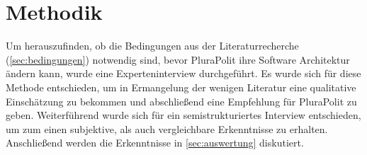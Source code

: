 \section{Methodik}
\label{sec:methodik}

Um herauszufinden, ob die Bedingungen aus der Literaturrecherche (\cref{sec:bedingungen}) notwendig sind, bevor PluraPolit ihre Software Architektur ändern kann, wurde eine Experteninterview durchgeführt. Es wurde sich für diese Methode entschieden, um in Ermangelung der wenigen Literatur eine qualitative Einschätzung zu bekommen und abschließend eine Empfehlung für PluraPolit zu geben. Weiterführend wurde sich für ein semistrukturiertes Interview entschieden, um zum einen subjektive, als auch vergleichbare Erkenntnisse zu erhalten. Anschließend werden die Erkenntnisse in \cref{sec:auswertung} diskutiert.





